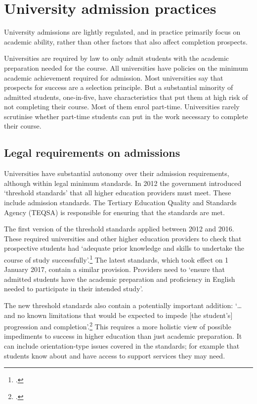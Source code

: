 \chapter{University admission practices}\label{chap:4}

University admissions are lightly regulated, and in practice primarily focus on academic ability, rather than other factors that also affect completion prospects.

Universities are required by law to only admit students with the academic preparation needed for the course. All universities have policies on the minimum academic achievement required for admission. Most universities say that prospects for success are a selection principle. But a substantial minority of admitted students, one-in-five, have characteristics that put them at high risk of not completing their course. Most of them enrol part-time. Universities rarely scrutinise whether part-time students can put in the work necessary to complete their course.

\section{Legal requirements on admissions}\label{sec:4.1}

Universities have substantial autonomy over their admission requirements, although within legal minimum standards. In 2012 the government introduced `threshold standards' that all higher education providers must meet. These include admission standards. The Tertiary Education Quality and Standards Agency (TEQSA) is responsible for ensuring that the standards are met.

The first version of the threshold standards applied between 2012 and 2016. These required universities and other higher education providers to check that prospective students had `adequate prior knowledge and skills to undertake the course of study successfully'.\footcite[][15]{DIICCSRTE2013c} The latest standards, which took effect on 1 January 2017, contain a similar provision. Providers need to `ensure that admitted students have the academic preparation and proficiency in English needed to participate in their intended study'.

The new threshold standards also contain a potentially important addition: `\ldots{} and no known limitations that would be expected to impede {[}the student's{]} progression and completion'.\footcite[][3]{DepartmentofEducationandTraining2015n} 
This requires a more holistic view of possible impediments to success in higher education than just academic preparation. It can include orientation-type issues covered in the standards; for example that students know about and have access to support services they may need.

